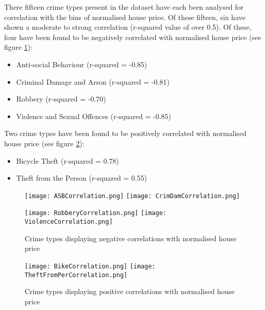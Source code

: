 \documentclass{article}
\begin{document}
There fifteen crime types present in the dataset have each been analysed for correlation with the bins of normalised house price. Of these fifteen, six have shown a moderate to strong correlation (r-squared value of over 0.5). Of these, four have been found to be negatively correlated with normalised house price (see figure \ref{fig:NegCorr}):
\begin{itemize}
\item Anti-social Behaviour (r-squared = -0.85)
\item Criminal Damage and Arson (r-squared = -0.81)
\item Robbery (r-squared = -0.70)
\item Violence and Sexual Offences (r-squared = -0.85)
\end{itemize}
\bigskip

Two crime types have been found to be positively correlated with normalised house price (see figure \ref{fig:PosCorr}):
\begin{itemize}
\item Bicycle Theft (r-squared = 0.78)
\item Theft from the Person (r-squared = 0.55)
\end{itemize}




\begin{figure}[H]
\ffigbox
{%
  \begin{subfloatrow}[2]
  {\texttt{[image: ASBCorrelation.png]}}\hskip10pt%
  {\texttt{[image: CrimDamCorrelation.png]}}
  \end{subfloatrow}\vskip10pt%
  \begin{subfloatrow}[2]
  {\texttt{[image: RobberyCorrelation.png]}}\hskip10pt%
  {\texttt{[image: ViolenceCorrelation.png]}}
  \end{subfloatrow}%
}
{\caption{Crime types displaying negative correlations with normalised house price}\label{fig:NegCorr}}
\end{figure}

\begin{figure}[H]
\ffigbox
{%
  \begin{subfloatrow}[2]
  {\texttt{[image: BikeCorrelation.png]}}\hskip10pt%
  {\texttt{[image: TheftFromPerCorrelation.png]}}
  \end{subfloatrow}%
}
{\caption{Crime types displaying positive correlations with normalised house price}\label{fig:PosCorr}}
\end{figure}
\end{document}
